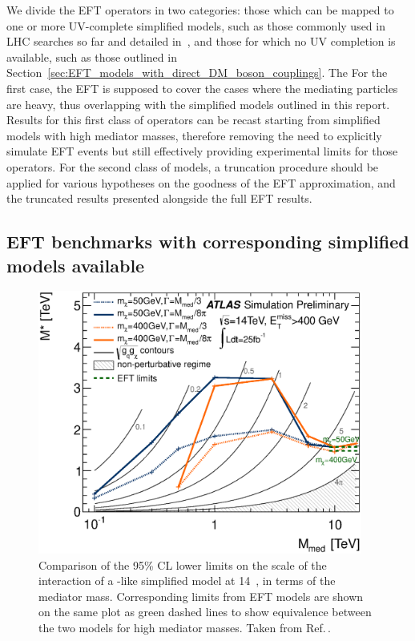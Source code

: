We divide the EFT operators in two categories: 
those which can be mapped to one or more UV-complete simplified models, such as those
commonly used in LHC searches so far and detailed in~\cite{Goodman:2010ku}, and those
for which no UV completion is available, such as those outlined in Section~\ref{sec:EFT_models_with_direct_DM_boson_couplings}. The For the first case, the EFT is supposed to cover the cases where the mediating particles are heavy,
thus overlapping with the simplified models outlined in this report.
Results for this first class of operators can be recast starting from simplified models with high mediator masses, 
therefore removing the need to explicitly simulate EFT events but still effectively providing experimental limits
for those operators. For the second class of models, a truncation procedure 
should be applied for various hypotheses on the goodness of the EFT approximation, 
and the truncated results presented alongside the full EFT results.

\subsection{EFT benchmarks with corresponding simplified models available}

\begin{figure}
\centering
\includegraphics[width=0.95\textwidth]{figures/monojet/lambda_14TeV_SR1.eps}
\caption{Comparison of the 95\% CL lower limits on the scale of the interaction of a \Zprime-like simplified model at 14~\tev, in terms of the mediator mass. Corresponding limits from EFT models are shown on the same plot as green dashed lines to show equivalence between the two models for high mediator masses.
Taken from Ref.\,\cite{ATL-PHYS-PUB-2014-007}.}
\label{fig:monojet_MstarMmed}
\end{figure}

